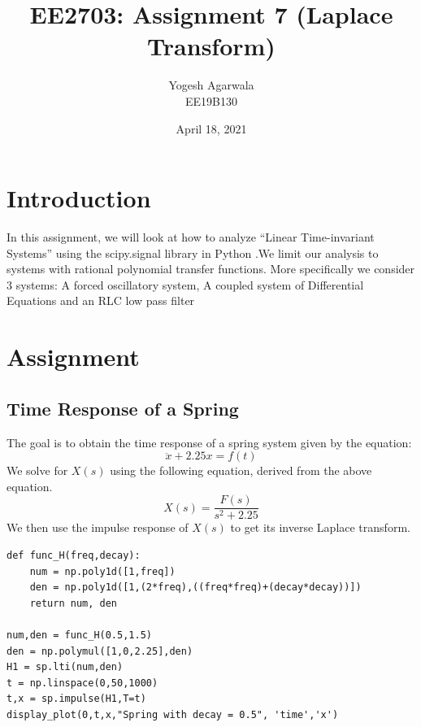 \documentclass{article}
\title{EE2703: Assignment 7 (Laplace Transform)}
\author{Yogesh Agarwala \\ EE19B130}
\date{April 18, 2021}
\begin{document}
\maketitle

\section{Introduction}
In this assignment, we will look at how to analyze “Linear Time-invariant Systems” using the scipy.signal library in Python .We limit our analysis to systems with rational polynomial transfer functions. More specifically we consider 3 systems: A forced oscillatory system, A coupled system of Differential Equations and an RLC low pass filter  

\section{Assignment}
\subsection{Time Response of a Spring}
The goal is to obtain the time response of a spring system given by the
equation:
\begin{equation}
    \ddot x + 2.25x = f(t)
\end{equation}
We solve for $X(s)$ using the following equation, derived from the above equation.
\begin{equation}
    X(s) = \frac{F(s)}{s^2+2.25}
\end{equation}
We then use the impulse response of $X(s)$ to get its inverse Laplace transform.

\lstset{language=Python}
\lstset{frame=lines}
\lstset{basicstyle=\footnotesize}
\begin{lstlisting}
def func_H(freq,decay):
	num = np.poly1d([1,freq])
	den = np.poly1d([1,(2*freq),((freq*freq)+(decay*decay))])
	return num, den

num,den = func_H(0.5,1.5)
den = np.polymul([1,0,2.25],den)
H1 = sp.lti(num,den)
t = np.linspace(0,50,1000)
t,x = sp.impulse(H1,T=t)
display_plot(0,t,x,"Spring with decay = 0.5", 'time','x')
\end{lstlisting}
\end{document}
